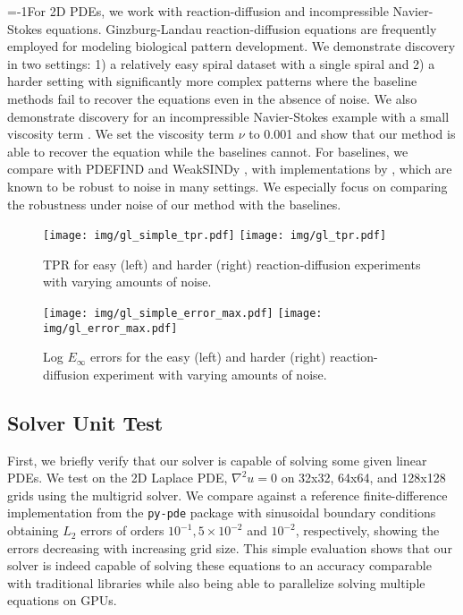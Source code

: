 \looseness=-1For 2D PDEs, we work with reaction-diffusion and incompressible Navier-Stokes equations. 
Ginzburg-Landau reaction-diffusion equations are frequently employed for modeling biological pattern development.
We demonstrate discovery in two settings: 1) a relatively easy spiral dataset with a single spiral and 2) a harder setting with significantly more complex patterns where the baseline methods fail to recover the equations even in the absence of noise.
We also demonstrate discovery for an incompressible Navier-Stokes example with a small viscosity term \cite{pyro_joss}.
We set the viscosity term $\nu$ to 0.001 and show that our method is able to recover the equation while the baselines cannot.
For baselines, we compare with PDEFIND \cite{rudy2017data} and WeakSINDy \cite{reinbold2020using}, with implementations by \citet{de2020pysindy}, which are known to be robust to noise in many settings.
We especially focus on comparing the robustness under noise of our method with the baselines.

\begin{figure}[t]
  \vskip -0.05in
    \texttt{[image: img/gl\_simple\_tpr.pdf]}
    \texttt{[image: img/gl\_tpr.pdf]}
  \vskip -0.1in
  \caption{TPR for easy (left) and harder (right) reaction-diffusion experiments with varying amounts of noise.}
  \vskip -0.05in
  \label{fig:rdiff-tpr}
\end{figure}
\begin{figure}
  \vskip -0.1in
    \texttt{[image: img/gl\_simple\_error\_max.pdf]}
    \texttt{[image: img/gl\_error\_max.pdf]}
  \vskip -0.1in
  \caption{Log $E_\infty$ errors for the easy (left) and harder (right) reaction-diffusion experiment with varying amounts of noise.}
  \label{fig:rdiff-infinity-error}
  \vskip -0.1in
\end{figure}

\subsection{Solver Unit Test}
First, we briefly verify that our solver is capable of solving some given linear PDEs. 
We test on the 2D Laplace PDE, $\nabla^2 u = 0$ on 32x32, 64x64, and 128x128 grids using the multigrid solver.
We compare against a reference finite-difference implementation from the \texttt{py-pde} \cite{pypde} package with sinusoidal boundary conditions obtaining $L_2$ errors of orders $10^{-1}, 5\times 10^{-2}$ and  $10^{-2}$, respectively, showing the errors decreasing with increasing grid size. This simple evaluation shows that our solver is indeed capable of solving these equations to an accuracy comparable with traditional libraries while also being able to parallelize solving multiple equations on GPUs.


